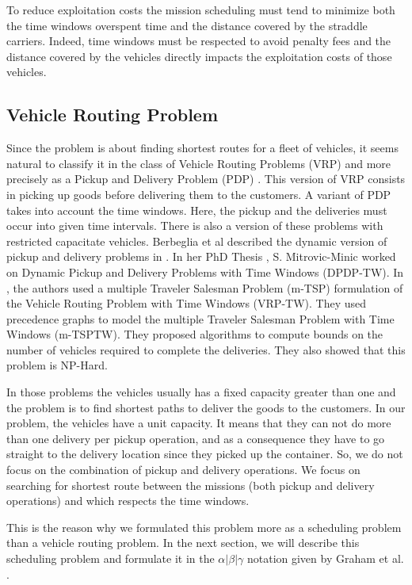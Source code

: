 \documentclass[a4paper,10pt]{article}
\begin{document}
To reduce exploitation costs the mission scheduling must tend to minimize both the time windows overspent time and the distance covered by the straddle carriers. Indeed, time windows must be respected to avoid penalty fees and the distance covered by the vehicles directly impacts the exploitation costs of those vehicles. %

\subsection{Vehicle Routing Problem}

Since the problem is about finding shortest routes for a fleet of vehicles, it seems natural to classify it in the class of Vehicle Routing Problems (VRP)\cite{Toth2001,Laporte1992} and more precisely as a Pickup and Delivery Problem (PDP) \cite{Berbeglia2007}. This version of VRP consists in picking up goods before delivering them to the customers. A variant of PDP takes into account the time windows\cite{Mitrovic1998}. Here, the pickup and the deliveries must occur into given time intervals. There is also a version of these problems with restricted capacitate vehicles\cite{Toth2001}.
Berbeglia et al described the dynamic version of pickup and delivery problems in \cite{Berbeglia2010}. In her PhD Thesis \cite{Mitrovic2001}, S. Mitrovic-Minic worked on Dynamic Pickup and Delivery Problems with Time Windows (DPDP-TW). In \cite{Mitrovic2006}, the authors used a multiple Traveler Salesman Problem (m-TSP) formulation of the Vehicle Routing Problem with Time Windows (VRP-TW). They used precedence graphs to model the multiple Traveler Salesman Problem with Time Windows (m-TSPTW). They proposed algorithms to compute bounds on the number of vehicles required to complete the deliveries. They also showed that this problem is NP-Hard.

In those problems the vehicles usually has a fixed capacity greater than one and the problem is to find shortest paths to deliver the goods to the customers. In our problem, the vehicles have a unit capacity. It means that they can not do more than one delivery per pickup operation, and as a consequence they have to go straight to the delivery location since they picked up the container. So, we do not focus on the combination of pickup and delivery operations. We focus on searching for shortest route between the missions (both pickup and delivery operations) and which respects the time windows.

This is the reason why we formulated this problem more as a scheduling problem than a vehicle routing problem. In the next section, we will describe this scheduling problem and formulate it in the $\alpha|\beta|\gamma$ notation given by Graham et al. \cite{Graham1979}.
\end{document}

